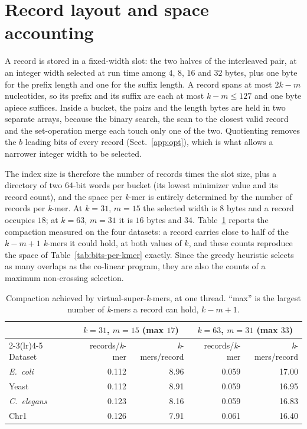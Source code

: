 \documentclass[runningheads,a4paper]{llncs}
\newcommand{\kmer}{\emph{k}-mer\xspace}
\newcommand{\kmers}{\emph{k}-mers\xspace}
\newcommand{\vskmers}{virtual-super-\emph{k}-mers\xspace}
\newif\ifrevmarkup\revmarkupfalse
\newcommand{\rev}[1]{\ifrevmarkup\textcolor{blue}{#1}\else#1\fi}
\newenvironment{revblock}{\ifrevmarkup\color{blue}\fi}{}
\begin{document}
\begin{revblock}
\section{Record layout and space accounting}
\label{app:layout}
A record is stored in a fixed-width slot: the two halves of the interleaved pair, at an integer width selected at run time among $4$, $8$, $16$ and $32$ bytes, plus one byte for the prefix length and one for the suffix length. A record spans at most $2k-m$ nucleotides, so its prefix and its suffix are each at most $k-m\le 127$ and one byte apiece suffices. Inside a bucket, the pairs and the length bytes are held in two separate arrays, because the binary search, the scan to the closest valid record and the set-operation merge each touch only one of the two. Quotienting removes the $b$ leading bits of every record (Sect.~\ref{app:opt}), which is what allows a narrower integer width to be selected.

The index size is therefore the number of records times the slot size, plus a directory of two $64$-bit words per bucket \rev{(its lowest minimizer value and its record count)}, and the space per \kmer is entirely determined by the number of records per \kmer. At $k=31$, $m=15$ the selected width is $8$ bytes and a record occupies $18$; at $k=63$, $m=31$ it is $16$ bytes and $34$. Table~\ref{tab:records} reports the compaction measured on the four datasets: a record carries close to half of the $k-m+1$ \kmers it could hold, at both values of $k$, and these counts reproduce the space of Table~\ref{tab:bits-per-kmer} exactly. Since the greedy heuristic selects as many overlaps as the co-linear program, they are also the counts of a maximum non-crossing selection.

\begin{table}[h]
\centering
\caption{\rev{Compaction achieved by \vskmers, at one thread. ``max'' is the largest number of \kmers a record can hold, $k-m+1$.}}
\label{tab:records}
\small
\setlength{\tabcolsep}{5pt}
\begin{revblock}
\begin{tabular}{lrrrr}
\toprule
 & \multicolumn{2}{c}{$k=31$, $m=15$ (max $17$)} & \multicolumn{2}{c}{$k=63$, $m=31$ (max $33$)} \\
\cmidrule(lr){2-3}\cmidrule(lr){4-5}
Dataset & records/\kmer & \kmers/record & records/\kmer & \kmers/record \\
\midrule
\emph{E.~coli}    & 0.112 & 8.96 & 0.059 & 17.00 \\
Yeast             & 0.112 & 8.91 & 0.059 & 16.95 \\
\emph{C.~elegans} & 0.123 & 8.16 & 0.059 & 16.83 \\
Chr1              & 0.126 & 7.91 & 0.061 & 16.40 \\
\bottomrule
\end{tabular}
\end{revblock}
\end{table}
\end{revblock}
\end{document}
